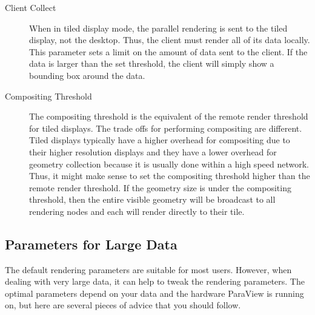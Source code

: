 \begin{description}
\item[Client Collect]  When in tiled display mode,
  the parallel rendering is sent to the tiled display, not the desktop.
  Thus, the client must render all of its data locally.  This parameter
  sets a limit on the amount of data sent to the client.  If the data is
  larger than the set threshold, the client will simply show a bounding box
  around the data.
\item[Compositing Threshold]  The compositing
  threshold is the equivalent of the remote render threshold for tiled
  displays.  The trade offs for performing compositing are different.
  Tiled displays typically have a higher overhead for compositing due to
  their higher resolution displays and they have a lower overhead for
  geometry collection because it is usually done within a high speed
  network.  Thus, it might make sense to set the compositing threshold
  higher than the remote render threshold.  If the geometry size is under
  the compositing threshold, then the entire visible geometry will be
  broadcast to all rendering nodes and each will render directly to their
  tile.
\end{description}

\subsection{Parameters for Large Data}

The default rendering parameters are suitable for most users.  However,
when dealing with very large data, it can help to tweak the rendering
parameters.  The optimal parameters depend on your data and the hardware
ParaView is running on, but here are several pieces of advice that you
should follow.

